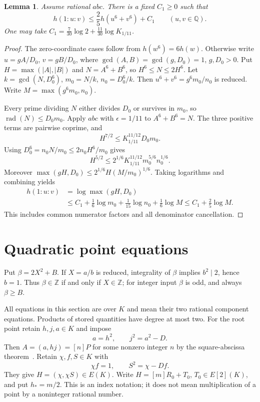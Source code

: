 \documentclass[11pt,a4paper]{article}
\newtheorem{lemma}[theorem]{Lemma}
\newcommand{\Q}{\mathbb Q}\newcommand{\Z}{\mathbb Z}
\DeclareMathOperator{\rad}{rad}
\begin{document}
\begin{lemma}\label{lem:pair}
Assume rational $abc$. There is a fixed $C_1\ge0$ such that
\[
                    h(1:u:v)\le\frac25h(u^6+v^6)+C_1
                    \qquad(u,v\in\Q).
\]
One may take $C_1=\frac7{30}\log2+\frac{11}{30}\log K_{1/11}$.
\end{lemma}
\begin{proof}
The zero-coordinate cases follow from $h(w^6)=6h(w)$.
Otherwise write $u=gA/D_0$, $v=gB/D_0$, where
$\gcd(A,B)=\gcd(g,D_0)=1$, $g,D_0>0$. Put
$H=\max(|A|,|B|)$ and $N=A^6+B^6$, so $H^6\le N\le2H^6$.
Let $k=\gcd(N,D_0^6)$, $m_0=N/k$, $n_0=D_0^6/k$.
Then $u^6+v^6=g^6m_0/n_0$ is reduced. Write
$M=\max(g^6m_0,n_0)$.

Every prime dividing $N$ either divides $D_0$ or survives in $m_0$,
so $\rad(N)\le D_0m_0$. Apply $abc$ with $\epsilon=1/11$ to
$A^6+B^6=N$. The three positive terms are pairwise coprime, and
\[
 H^{7/2}\le K_{1/11}^{11/12}D_0m_0.
\]
Using $D_0^6=n_0N/m_0\le2n_0H^6/m_0$ gives
\[
 H^{5/2}\le2^{1/6}K_{1/11}^{11/12}m_0^{5/6}n_0^{1/6}.
\]
Moreover $\max(gH,D_0)\le2^{1/6}H(M/m_0)^{1/6}$.
Taking logarithms and combining yields
\[
 \begin{split}
 h(1:u:v)&=\log\max(gH,D_0)\\
 &\le C_1+\frac16\log m_0+\frac1{15}\log n_0+\frac16\log M
 \le C_1+\frac25\log M.
 \end{split}
\]
This includes common numerator factors and all denominator cancellation.
\end{proof}

\section{Quadratic point equations}

Put $\beta=2X^2+B$. If $X=a/b$ is reduced, integrality of $\beta$
implies $b^2\mid2$, hence $b=1$. Thus $\beta\in\Z$ if and only if
$X\in\Z$; for integer input $\beta$ is odd, and always $\beta\ge B$.

All equations in this section are over $K$ and mean their two rational
component equations. Products of stored quantities have degree at most two.
For the root point retain $h,j,a\in K$ and impose
\begin{equation}\label{eq:root}
                       a=h^2,\qquad j^2=a^2-D.
\end{equation}
Then $A=(a,hj)=[n]P$ for some nonzero integer $n$ by the
square-abscissa theorem~\cite{Squares}. Retain $\chi,f,S\in K$ with
\begin{equation}\label{eq:H}
                    \chi f=1,\qquad S^2=\chi-Df.
\end{equation}
They give $H=(\chi,\chi S)\in E(K)$. Write
$H=[m]R_0+T_0$, $T_0\in E[2](K)$, and put $h_*=m/2$.
This is an index notation; it does not mean multiplication of a point
by a noninteger rational number.
\end{document}

